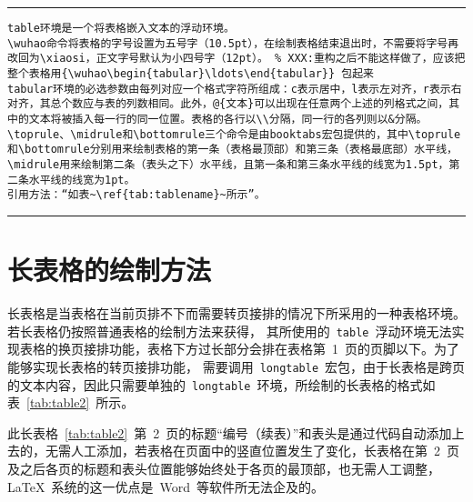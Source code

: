 \noindent\hrule

\begin{verbatim}
table环境是一个将表格嵌入文本的浮动环境。
\wuhao命令将表格的字号设置为五号字（10.5pt），在绘制表格结束退出时，不需要将字号再改回为\xiaosi，正文字号默认为小四号字（12pt）。 % XXX:重构之后不能这样做了，应该把整个表格用{\wuhao\begin{tabular}\ldots\end{tabular}} 包起来
tabular环境的必选参数由每列对应一个格式字符所组成：c表示居中，l表示左对齐，r表示右对齐，其总个数应与表的列数相同。此外，@{文本}可以出现在任意两个上述的列格式之间，其中的文本将被插入每一行的同一位置。表格的各行以\\分隔，同一行的各列则以&分隔。
\toprule、\midrule和\bottomrule三个命令是由booktabs宏包提供的，其中\toprule和\bottomrule分别用来绘制表格的第一条（表格最顶部）和第三条（表格最底部）水平线，\midrule用来绘制第二条（表头之下）水平线，且第一条和第三条水平线的线宽为1.5pt，第二条水平线的线宽为1pt。
引用方法：“如表~\ref{tab:tablename}~所示”。
\end{verbatim}

\noindent\hrule

\section{长表格的绘制方法}

长表格是当表格在当前页排不下而需要转页接排的情况下所采用的一种表格环境。若长表格仍按照普通表格的绘制方法来获得，
其所使用的~\verb|table|~浮动环境无法实现表格的换页接排功能，表格下方过长部分会排在表格第~1~页的页脚以下。为了能够实现长表格的转页接排功能，
需要调用~\verb|longtable|~宏包，由于长表格是跨页的文本内容，因此只需要单独的~\verb|longtable|~环境，所绘制的长表格的格式如表~\ref{tab:table2}~所示。

此长表格~\ref{tab:table2}~第~2~页的标题“编号（续表）”和表头是通过代码自动添加上去的，无需人工添加，若表格在页面中的竖直位置发生了变化，长表格在第~2~页
及之后各页的标题和表头位置能够始终处于各页的最顶部，也无需人工调整，\LaTeX~系统的这一优点是~Word~等软件所无法企及的。

